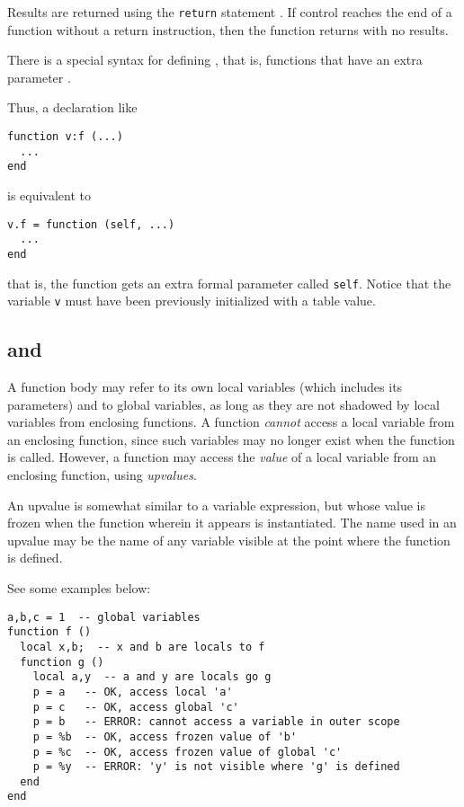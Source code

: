 Results are returned using the \verb|return| statement .
If control reaches the end of a function without a return instruction,
then the function returns with no results.

There is a special syntax for defining ,
that is, functions that have an extra parameter .
\begin{Produc}
\end{Produc}%
Thus, a declaration like
\begin{verbatim}
function v:f (...)
  ...
end
\end{verbatim}
is equivalent to
\begin{verbatim}
v.f = function (self, ...)
  ...
end
\end{verbatim}
that is, the function gets an extra formal parameter called \verb|self|.
Notice that the variable \verb|v| must have been
previously initialized with a table value.


\subsection{ and } \label{upvalue}

A function body may refer to its own local variables
(which includes its parameters) and to global variables,
as long as they are not shadowed by local
variables from enclosing functions.
A function \emph{cannot} access a local
variable from an enclosing function,
since such variables may no longer exist when the function is called.
However, a function may access the \emph{value} of a local variable
from an enclosing function, using \emph{upvalues}.

\begin{Produc}
\end{Produc}
An upvalue is somewhat similar to a variable expression,
but whose value is frozen when the function wherein it
appears is instantiated.
The name used in an upvalue may be the name of any variable visible
at the point where the function is defined.

See some examples below:
\begin{verbatim}
a,b,c = 1  -- global variables
function f ()
  local x,b;  -- x and b are locals to f
  function g ()
    local a,y  -- a and y are locals go g
    p = a   -- OK, access local 'a'
    p = c   -- OK, access global 'c'
    p = b   -- ERROR: cannot access a variable in outer scope
    p = %b  -- OK, access frozen value of 'b'
    p = %c  -- OK, access frozen value of global 'c'
    p = %y  -- ERROR: 'y' is not visible where 'g' is defined
  end
end
\end{verbatim}


